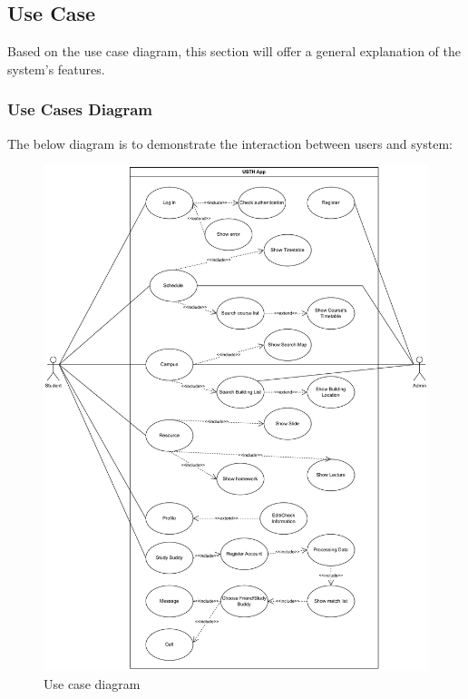 \documentclass{article}
\begin{document}
\subsection{Use Case}
Based on the use case diagram, this section will offer a general explanation of the system's
features.

\subsubsection{Use Cases Diagram}
    The below diagram is to demonstrate the interaction between users and system:
    \begin{figure}[H]
        \centering
        \includegraphics[width=1\textwidth]{image/USTHConnect_usecase.pdf} 
        \caption{Use case diagram}
        \label{fig:usthconnect_use_case}
    \end{figure}

    \pagebreak
\end{document}

